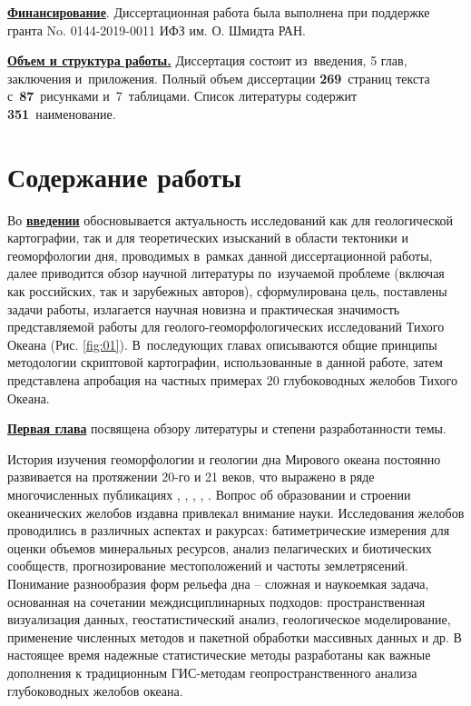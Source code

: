 
\underline{\textbf{Финансирование}}. Диссертационная работа была выполнена при поддержке гранта No. 0144-2019-0011 ИФЗ им. О. Шмидта РАН.

\underline{\textbf{Объем и структура работы.}} Диссертация состоит из~введения,
5 глав, заключения и~приложения. Полный объем диссертации
\textbf{269}~страниц текста с~\textbf{87}~рисунками и~7~таблицами. Список
литературы содержит \textbf{351}~наименование.

\section*{Содержание работы}
Во \underline{\textbf{введении}} обосновывается актуальность исследований как для геологической картографии, так и для теоретических изысканий в области тектоники и геоморфологии дня, проводимых в~рамках данной диссертационной работы, далее 
приводится обзор научной литературы по~изучаемой проблеме (включая как российских, так и зарубежных авторов), сформулирована цель, поставлены задачи работы, излагается научная новизна и практическая значимость представляемой работы для геолого-геоморфологических исследований Тихого Океана (Рис. \ref{fig:01}). В~последующих главах описываются общие принципы методологии скриптовой картографии, использованные в данной работе, затем представлена апробация на частных примерах 20 глубоководных желобов Тихого Океана.

\underline{\textbf{Первая глава}} посвящена обзору литературы и степени разработанности темы.

История изучения геоморфологии и геологии дна Мирового океана постоянно развивается на протяжении 20-го и 21 веков, что выражено в ряде многочисленных публикациях  \cite{БоголеповЧиков}, \cite{Живаго1984}, \cite{Зенкевич1970}, \cite{Илларионов2016}, \cite{Илларионов2017}. Вопрос об образовании и строении океанических желобов издавна привлекал внимание науки. Исследования желобов проводились в различных аспектах и ракурсах: батиметрические измерения для оценки объемов минеральных ресурсов, анализ пелагических и биотических сообществ, прогнозирование местоположений и частоты землетрясений. Понимание разнообразия форм рельефа дна – сложная и наукоемкая задача, основанная на сочетании междисциплинарных подходов: пространственная визуализация данных, геостатистический анализ, геологическое моделирование, применение численных методов и пакетной обработки массивных данных и др. В настоящее время надежные статистические методы разработаны как важные дополнения к традиционным ГИС-методам геопространственного анализа глубоководных желобов океана. 


